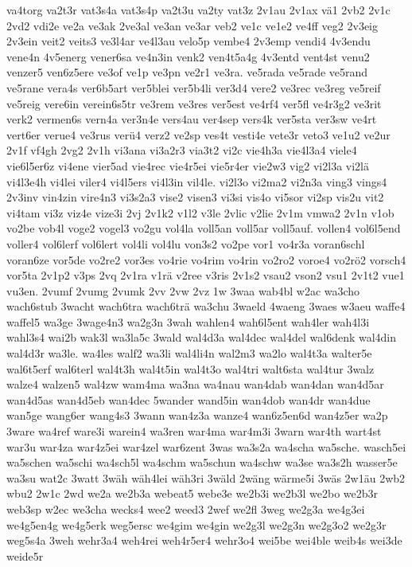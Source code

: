 {va4torg
va2t3r
vat3s4a
vat3s4p
va2t3u
va2ty
vat3z
2v1au
2v1ax
vä1
2vb2
2v1c
2vd2
vdi2e
ve2a
ve3ak
2ve3al
ve3an
ve3ar
veb2
ve1c
ve1e2
ve4ff
veg2
2v3eig
2v3ein
veit2
veits3
ve3l4ar
ve4l3au
velo5p
vembe4
2v3emp
vendi4
4v3endu
vene4n
4v5energ
vener6sa
ve4n3in
venk2
ven4t5a4g
4v3entd
vent4st
venu2
venzer5
ven6z5ere
ve3of
ve1p
ve3pn
ve2r1
ve3ra.
ve5rada
ve5rade
ve5rand
ve5rane
vera4s
ver6b5art
ver5blei
ver5b4li
ver3d4
vere2
ve3rec
ve3reg
ve5reif
ve5reig
vere6in
verein6s5tr
ve3rem
ve3res
ver5est
ve4rf4
ver5fl
ve4r3g2
ve3rit
verk2
vermen6s
vern4a
ver3n4e
vers4au
ver4sep
vers4k
ver5sta
ver3sw
ve4rt
vert6er
verue4
ve3rus
verü4
verz2
ve2sp
ves4t
vesti4e
vete3r
veto3
ve1u2
ve2ur
2v1f
vf4gh
2vg2
2v1h
vi3ana
vi3a2r3
via3t2
vi2c
vie4h3a
vie4l3a4
viele4
vie6l5er6z
vi4ene
vier5ad
vie4rec
vie4r5ei
vie5r4er
vie2w3
vig2
vi2l3a
vi2lä
vi4l3e4h
vi4lei
viler4
vi4l5ers
vi4l3in
vil4le.
vi2l3o
vi2ma2
vi2n3a
ving3
vings4
2v3inv
vin4zin
vire4n3
vi3s2a3
vise2
visen3
vi3si
vis4o
vi5sor
vi2sp
vis2u
vit2
vi4tam
vi3z
viz4e
vize3i
2vj
2v1k2
v1l2
v3le
2vlic
v2lie
2v1m
vmwa2
2v1n
v1ob
vo2be
vob4l
voge2
vogel3
vo2gu
vol4la
voll5an
voll5ar
voll5auf.
vollen4
vol6l5end
voller4
vol6lerf
vol6lert
vol4li
vol4lu
von3s2
vo2pe
vor1
vo4r3a
voran6schl
voran6ze
vor5de
vo2re2
vor3es
vo4rie
vo4rim
vo4rin
vo2ro2
voroe4
vo2rö2
vorsch4
vor5ta
2v1p2
v3ps
2vq
2v1ra
v1rä
v2ree
v3ris
2v1s2
vsau2
vson2
vsu1
2v1t2
vue1
vu3en.
2vumf
2vumg
2vumk
2vv
2vw
2vz
1w
3waa
wab4bl
w2ac
wa3cho
wach6stub
3wacht
wach6tra
wach6trä
wa3chu
3waeld
4waeng
3waes
w3aeu
waffe4
waffel5
wa3ge
3wage4n3
wa2g3n
3wah
wahlen4
wah6l5ent
wah4ler
wah4l3i
wahl3s4
wai2b
wak3l
wa3la5c
3wald
wal4d3a
wal4dec
wal4del
wal6denk
wal4din
wal4d3r
wa3le.
wa4les
walf2
wa3li
wal4li4n
wal2m3
wa2lo
wal4t3a
walter5e
wal6t5erf
wal6terl
wal4t3h
wal4t5in
wal4t3o
wal4tri
walt6sta
wal4tur
3walz
walze4
walzen5
wal4zw
wam4ma
wa3na
wa4nau
wan4dab
wan4dan
wan4d5ar
wan4d5as
wan4d5eb
wan4dec
5wander
wand5in
wan4dob
wan4dr
wan4due
wan5ge
wang6er
wang4s3
3wann
wan4z3a
wanze4
wan6z5en6d
wan4z5er
wa2p
3ware
wa4ref
ware3i
warein4
wa3ren
war4ma
war4m3i
3warn
war4th
wart4st
war3u
war4za
war4z5ei
war4zel
war6zent
3was
wa3s2a
wa4scha
wa5sche.
wasch5ei
wa5schen
wa5schi
wa4sch5l
wa4schm
wa5schun
wa4schw
wa3se
wa3s2h
wasser5e
wa3su
wat2c
3watt
3wäh
wäh4lei
wäh3ri
3wäld
2wäng
wärme5i
3wäs
2w1äu
2wb2
wbu2
2w1c
2wd
we2a
we2b3a
webeat5
webe3e
we2b3i
we2b3l
we2bo
we2b3r
web3sp
w2ec
we3cha
wecks4
wee2
weed3
2wef
we2fl
3weg
we2g3a
we4g3ei
we4g5en4g
we4g5erk
weg5ersc
we4gim
we4gin
we2g3l
we2g3n
we2g3o2
we2g3r
weg5s4a
3weh
wehr3a4
weh4rei
weh4r5er4
wehr3o4
wei5be
wei4ble
weib4s
wei3de
weide5r
}
